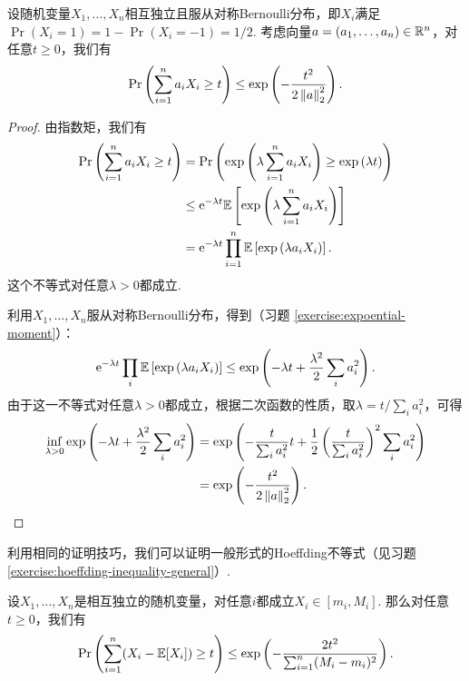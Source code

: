 \begin{theorem}\label{thm:hoeffding-inequality}
    设随机变量$X_1, \dots, X_n$相互独立且服从对称Bernoulli分布，即$X_i$满足$\Pr(X_i=1)=1-\Pr(X_i=-1)=1/2$. 考虑向量$a = (a_1, \dots, a_n) \in \mathbb{R}^n$，对任意$t\geq0$，我们有
    \[
        \Pr\left(\sum_{i=1}^n a_i X_i \geq t\right)\leq \exp \left( - \frac{t^2}{2\left\|a\right\|^2_2}\right).
    \]
\end{theorem}
\begin{proof}
由指数矩，我们有
\[
\begin{aligned}
    \Pr\left(\sum_{i=1}^n a_i X_i \geq t\right) &= \Pr\left(\exp\left(\lambda \sum_{i=1}^n a_i X_i\right) \geq \exp\left(\lambda t\right)\right) \\
    &\leq \mathrm{e}^{-\lambda t} \mathbb{E} \left[\exp\left(\lambda \sum_{i=1}^n a_i X_i\right)\right]\\
    &=  \mathrm{e}^{-\lambda t}\prod_{i=1}^n \mathbb{E}\left[\exp\left(\lambda a_i X_i\right)\right].
\end{aligned}
\]
这个不等式对任意$\lambda > 0$都成立. 

利用$X_1, \dots, X_n$服从对称Bernoulli分布，得到（习题 \ref{exercise:expoential-moment}）：
\begin{equation}
\mathrm{e}^{-\lambda t}\prod_{i} \mathbb{E}\left[\exp\left(\lambda a_i X_i\right)\right]\leq\exp \left(-\lambda t + \frac{\lambda^2}{2} \sum_{i} a_i^2\right).\label{eq:exponential-moment}
\end{equation}
由于这一不等式对任意$\lambda > 0$都成立，根据二次函数的性质，取$\lambda = t / \sum_i a_i^2$，可得
\[
\begin{aligned}
    \inf_{\lambda>0}\exp \left(-\lambda t + \frac{\lambda^2}{2} \sum_{i} a_i^2\right) &=\exp\left( -\frac{t}{\sum_i a_i^2} t + \frac12 \left(\frac{t}{\sum_i a_i^2}\right)^2 \sum_{i} a_i^2\right) \\
    &= \exp \left( - \frac{t^2}{2\left\|a\right\|_2^2}\right).
\end{aligned}
\]
\end{proof}

利用相同的证明技巧，我们可以证明一般形式的Hoeffding不等式（见习题 \ref{exercise:hoeffding-inequality-general}）.

\begin{theorem}\label{thm:hoeffding-inequality-general}
    设$X_1, \dots, X_n$是相互独立的随机变量，对任意$i$都成立$X_i \in [m_i, M_i]$. 那么对任意$t\geq0$，我们有
    \[
        \Pr\left(\sum_{i=1}^n (X_i - \mathbb{E} [X_i]) \geq t\right) \leq \exp \left( - \frac{2t^2}{\sum_{i=1}^n (M_i - m_i)^2}\right).
    \]
\end{theorem}


